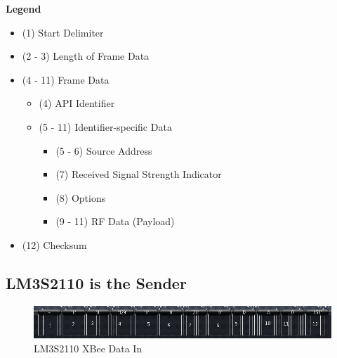 \documentclass[11pt, titlepage]{article}
\begin{document}
            \textbf{Legend}
            \begin{itemize}
                \item (1) Start Delimiter
                \item (2 - 3) Length of Frame Data
                \item (4 - 11) Frame Data
                    \begin{itemize}
                        \item (4) API Identifier
                        \item (5 - 11) Identifier-specific Data
                            \begin{itemize}
                                \item (5 - 6) Source Address
                                \item (7) Received Signal Strength Indicator
                                \item (8) Options
                                \item (9 - 11) RF Data (Payload)
                            \end{itemize}
                    \end{itemize}
                \item (12) Checksum
            \end{itemize}
        
        \subsection{LM3S2110 is the Sender}
            \FloatBarrier
            \begin{figure}[htbp]
                \centering
                \includegraphics[scale = 0.8]{Screenshots/2110_in.png}
                \caption{LM3S2110 XBee Data In}
            \end{figure}
            \FloatBarrier
            
\end{document}
